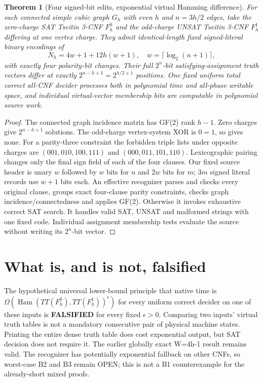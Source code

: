 \documentclass[11pt]{article}
\newtheorem{theorem}{Theorem}
\begin{document}
\begin{theorem}[Four signed-bit edits, exponential virtual Hamming difference]
For each connected simple cubic graph $G_h$ with even $h$ and $n=3h/2$ edges, take the zero-charge SAT Tseitin 3-CNF $F_h^0$ and the odd-charge UNSAT Tseitin 3-CNF $F_h^1$ differing at one vertex charge. They admit identical-length fixed signed-literal binary encodings of
\[
N_h=4w+1+12h(w+1),\quad w=\lceil\log_2(n+1)\rceil,
\]
with exactly four polarity-bit changes. Their full $2^n$-bit satisfying-assignment truth vectors differ at exactly $2^{n-h+1}=2^{h/2+1}$ positions. One fixed uniform total correct all-CNF decider processes both in polynomial time and all-phase writable space, and individual virtual-vector membership bits are computable in polynomial source work.
\end{theorem}
\begin{proof}
The connected graph incidence matrix has GF(2) rank $h-1$. Zero charges give $2^{n-h+1}$ solutions. The odd-charge vertex-system XOR is $0=1$, so gives none. For a parity-three constraint the forbidden triple lists under opposite charges are $(001,010,100,111)$ and $(000,011,101,110)$. Lexicographic pairing changes only the final sign field of each of the four clauses. Our fixed source header is unary $w$ followed by $w$ bits for $n$ and $2w$ bits for $m$; $3m$ signed literal records use $w+1$ bits each. An effective recognizer parses and checks every original clause, groups exact four-clause parity constraints, checks graph incidence/connectedness and applies GF(2). Otherwise it invokes exhaustive correct SAT search. It handles valid SAT, UNSAT and malformed strings with one fixed code. Individual assignment membership tests evaluate the source without writing its $2^n$-bit vector.
\end{proof}

\section*{What is, and is not, falsified}
The hypothetical universal lower-bound principle that native time is $\Omega(\operatorname{Ham}(TT(F_h^0),TT(F_h^1))^\epsilon)$ for every uniform correct decider on one of these inputs is \textbf{FALSIFIED} for every fixed $\epsilon>0$. Comparing two inputs' virtual truth tables is not a mandatory consecutive pair of physical machine states. Printing the entire dense truth table does cost exponential output, but SAT decision does not require it. The earlier globally exact W=4h-1 result remains valid. The recognizer has potentially exponential fallback on other CNFs, so worst-case B2 and B3 remain OPEN; this is not a B1 counterexample for the already-short mixed proofs.
\end{document}
